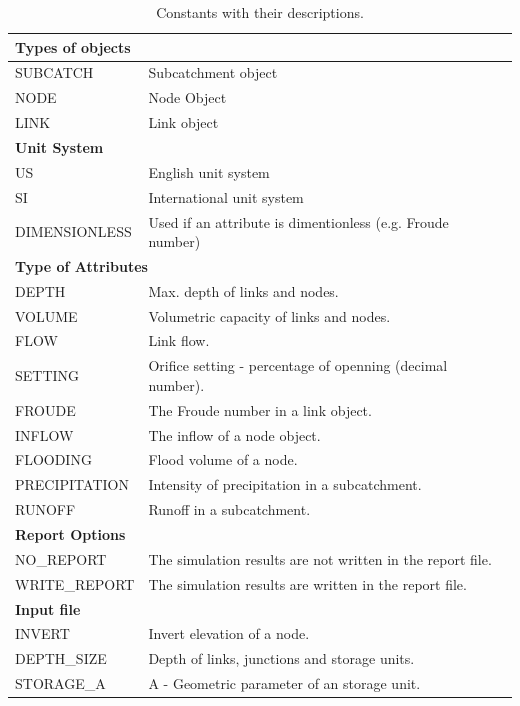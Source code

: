 \documentclass[11pt, letterpaper]{article}
\begin{document}
\begin{center}
\begin{table}
\caption {Constants with their descriptions.} \label{tab:constants} 
\def\arraystretch{1.15}%
\begin{adjustbox}{center}
\begin{tabular}{ |l|l| }
	\hline
	\multicolumn{2}{|l|}{\bf Types of objects} \\
	\hline
	SUBCATCH & Subcatchment object \\
	NODE  & Node Object \\
	LINK  & Link object \\
	\hline
	\multicolumn{2}{|l|}{\bf Unit System} \\
	\hline
	US & English unit system \\
	SI & International unit system \\
	DIMENSIONLESS & Used if an attribute is dimentionless (e.g. Froude number) \\
	\hline
	\multicolumn{2}{|l|}{\bf Type of Attributes} \\
	\hline 
	DEPTH & Max. depth of links and nodes.\\
	VOLUME & Volumetric capacity of links and nodes.\\
	FLOW & Link flow.\\
	SETTING & Orifice setting - percentage of openning (decimal number). \\
	FROUDE & The Froude number in a link object. \\
	INFLOW & The inflow of a node object. \\
	FLOODING & Flood volume of a node. \\
	PRECIPITATION & Intensity of precipitation in a subcatchment.\\
	RUNOFF & Runoff in a subcatchment. \\
	\hline
	\multicolumn{2}{|l|}{\bf Report Options} \\
	\hline 
	NO\_REPORT & The simulation results are not written in the report file. \\
	WRITE\_REPORT & The simulation results are written in the report file.\\
	\hline
	\multicolumn{2}{|l|}{\bf Input file} \\
	\hline 
	INVERT & Invert elevation of a node. \\
	DEPTH\_SIZE & Depth of links, junctions and storage units.  \\
	STORAGE\_A & A - Geometric parameter of an storage unit. \\

\end{tabular}
\end{adjustbox}
\end{table}
\end{center}
\end{document}
